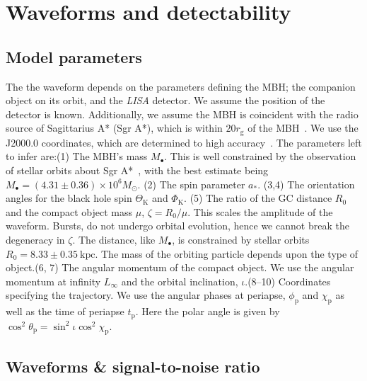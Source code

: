 \documentclass[11pt,twoside]{article}
\begin{document}
\section{Waveforms and detectability}\label{sec:Waveforms}

\subsection{Model parameters}

The the waveform depends on the parameters defining the MBH; the companion object on its orbit, and the \textit{LISA} detector. We assume the position of the detector is known. Additionally, we assume the MBH is coincident with the radio source of Sagittarius A* (Sgr A*),
which is within $20 r_\mathrm{g}$ of the MBH~\citep{Reid2003,Doeleman2008}. We use the J2000.0 coordinates, which are determined to high accuracy~\citep{Reid1999, Yusef-Zadeh1999}. The parameters left to infer are:(1) The MBH's mass $M_\bullet$. This is well constrained by the observation of stellar orbits about Sgr A*~\citep{Ghez2008, Gillessen2009}, with the best estimate being $M_\bullet = (4.31 \pm 0.36) \times 10^6 M_\odot$. (2) The spin parameter $a_\ast$. (3,4) The orientation angles for the black hole spin $\Theta_\mathrm{K}$ and $\Phi_\mathrm{K}$. (5) The ratio of the GC distance $R_0$ and the compact object mass $\mu$, $\zeta = R_0/\mu$. This scales the amplitude of the waveform. Bursts, do not undergo orbital evolution, hence we cannot break the degeneracy in $\zeta$. The distance, like $M_\bullet$, is constrained by stellar orbits~\citep{Gillessen2009} $R_0 = 8.33 \pm 0.35~\mathrm{kpc}$. The mass of the orbiting particle depends upon the type of object.(6, 7) The angular momentum of the compact object. We use the angular momentum at infinity $L_\infty$ and the orbital inclination, $\iota$.(8--10) Coordinates specifying the trajectory. We use the angular phases at periapse, $\phi_\mathrm{p}$ and $\chi_\mathrm{p}$ as well as the time of periapse $t_\mathrm{p}$. Here the polar angle is given by $\cos^2\theta_\mathrm{p} = \sin^2\iota\cos^2\chi_\mathrm{p}$.

\subsection{Waveforms \& signal-to-noise ratio}
\end{document}
